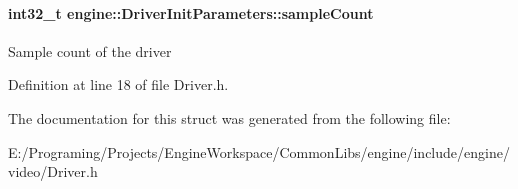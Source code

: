 \paragraph[{\texorpdfstring{sample\+Count}{sampleCount}}]{\setlength{\rightskip}{0pt plus 5cm}int32\+\_\+t engine\+::\+Driver\+Init\+Parameters\+::sample\+Count}\hypertarget{a00028_afab1afded563f9ab42273f7993cdf3ed}{}\label{a00028_afab1afded563f9ab42273f7993cdf3ed}
Sample count of the driver 

Definition at line 18 of file Driver.\+h.



The documentation for this struct was generated from the following file\+:\begin{DoxyCompactItemize}
\item 
E\+:/\+Programing/\+Projects/\+Engine\+Workspace/\+Common\+Libs/engine/include/engine/video/Driver.\+h\end{DoxyCompactItemize}
